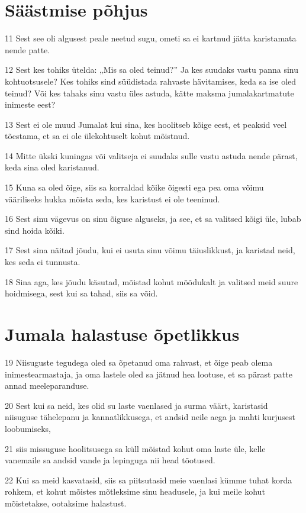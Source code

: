 \section*{Säästmise põhjus}

\par 11 Sest see oli algusest peale neetud sugu, ometi sa ei kartnud jätta karistamata nende patte.
\par 12 Sest kes tohiks ütelda: „Mis sa oled teinud?” Ja kes suudaks vastu panna sinu kohtuotsusele? Kes tohiks sind süüdistada rahvaste hävitamises, keda sa ise oled teinud? Või kes tahaks sinu vastu üles astuda, kätte maksma jumalakartmatute inimeste eest?
\par 13 Sest ei ole muud Jumalat kui sina, kes hoolitseb kõige eest, et peaksid veel tõestama, et sa ei ole ülekohtuselt kohut mõistnud.
\par 14 Mitte ükski kuningas või valitseja ei suudaks sulle vastu astuda nende pärast, keda sina oled karistanud.
\par 15 Kuna sa oled õige, siis sa korraldad kõike õigesti ega pea oma võimu vääriliseks hukka mõista seda, kes karistust ei ole teeninud.
\par 16 Sest sinu vägevus on sinu õiguse alguseks, ja see, et sa valitsed kõigi üle, lubab sind hoida kõiki.
\par 17 Sest sina näitad jõudu, kui ei usuta sinu võimu täiuslikkust, ja karistad neid, kes seda ei tunnusta.
\par 18 Sina aga, kes jõudu käsutad, mõistad kohut mõõdukalt ja valitsed meid suure hoidmisega, sest kui sa tahad, siis sa võid. 

\section*{Jumala halastuse õpetlikkus}

\par 19 Niisuguste tegudega oled sa õpetanud oma rahvast, et õige peab olema inimestearmastaja, ja oma lastele oled sa jätnud hea lootuse, et sa pärast patte annad meeleparanduse.
\par 20 Sest kui sa neid, kes olid su laste vaenlased ja surma väärt, karistasid niisuguse tähelepanu ja kannatlikkusega, et andsid neile aega ja mahti kurjusest loobumiseks,
\par 21 siis missuguse hoolitsusega sa küll mõistad kohut oma laste üle, kelle vanemaile sa andsid vande ja lepinguga nii head tõotused.
\par 22 Kui sa meid kasvatasid, siis sa piitsutasid meie vaenlasi kümme tuhat korda rohkem, et kohut mõistes mõtleksime sinu headusele, ja kui meile kohut mõistetakse, ootaksime halastust. 


